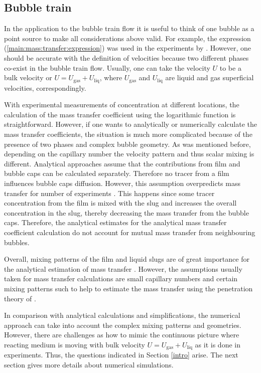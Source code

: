 \documentclass{article}
\newcommand{\uliq}{U_{\mathrm{liq}}}
\newcommand{\ugas}{U_{\mathrm{gas}}}
\begin{document}
\subsection{Bubble train}
In the application to the bubble train flow it is useful to think of one bubble as a point
source to make all considerations above valid. For example, the expression
(\ref{main:mass:transfer:expression}) was used in the experiments by
\citet{bercic-mass}. However, one should be accurate with the definition of velocities because two
different phases co-exist in the bubble train flow. Usually, one can take the velocity $U$ to be
a bulk velocity or $U=\ugas+\uliq$, where $\ugas$ and $\uliq$ are liquid and gas
superficial velocities, correspondingly. 

With experimental measurements of concentration at different locations, the calculation
of the mass transfer coefficient using the logarithmic function is straightforward.
However, if one wants to analytically or numerically calculate the mass transfer coefficients, the
situation is much more complicated because of the presence of two phases and complex bubble
geometry. As was mentioned before, depending on the capillary
number the velocity pattern and thus scalar mixing is different. Analytical approaches
\cite{irandoust,vanbaten-circular} assume that the
contributions from film and bubble caps can be calculated separately. Therefore no tracer from a film influences bubble caps diffusion.   However, this assumption overpredicts mass transfer for number of experiments \cite{irandoust}. This happens since some tracer
concentration from the film is mixed with the slug and increases the overall concentration in the slug, thereby decreasing
the mass transfer from the bubble caps.
Therefore, the analytical estimates for the analytical mass transfer coefficient calculation  do not account for mutual mass
transfer from neighbouring bubbles.

Overall, mixing patterns of the film and liquid slugs are of great importance for the analytical
estimation of mass transfer \cite{yue-mass}. However, the assumptions usually taken for 
mass transfer calculations are small capillary numbers and certain mixing patterns such to help to
estimate the mass transfer using the penetration theory of \citet{higbie}.

In comparison with analytical calculations and simplifications, the numerical approach can take into
account the complex mixing patterns and geometries. However, there are challenges as  how to
mimic the continuous picture where reacting medium is moving with bulk velocity $U=\ugas+\uliq$  as it is done in
experiments. Thus, the questions indicated in Section \ref{intro} arise.  The next section gives more
 details about numerical simulations.
 
\end{document}
